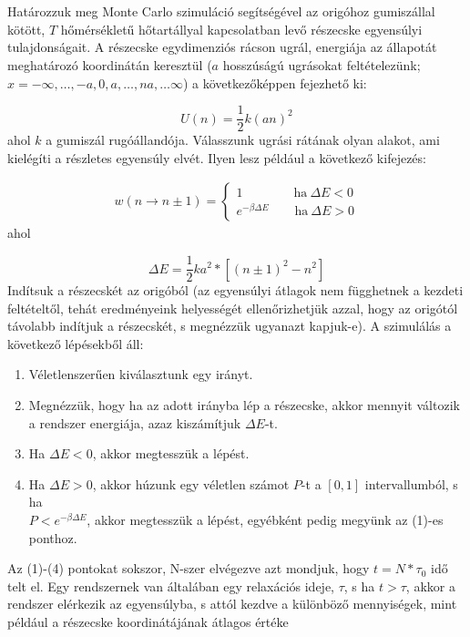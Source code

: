 \section{} \label{sec:1}
\quest{}
Határozzuk meg Monte Carlo szimuláció segítségével az origóhoz gumiszállal kötött, $T$ hőmérsékletű hőtartállyal kapcsolatban levő részecske egyensúlyi tulajdonságait. A részecske egydimenziós rácson ugrál, energiája az állapotát meghatározó koordinátán keresztül ($a$ hosszúságú ugrásokat feltételezünk; $x = - \infty, \dots, -a, 0, a, \dots, na, \dots \infty$) a következőképpen fejezhető ki:

\begin{equation*}
    U \left( n \right)
    =
    \frac{1}{2} k \left( a n \right)^{2}
\end{equation*}
ahol $k$ a gumiszál rugóállandója. Válasszunk ugrási rátának olyan alakot, ami kielégíti a részletes egyensúly elvét. Ilyen lesz például a következő kifejezés:

\begin{align*}
    w \left( n \to n \pm 1 \right)
    =
    \begin{cases}
        1 \quad \quad \quad \quad \text{ha}\ \Delta E < 0 \\
        e^{- \beta \Delta E} \quad \quad \text{ha}\ \Delta E > 0
    \end{cases}
\end{align*}
ahol

\begin{equation*}
    \Delta E
    =
    \frac{1}{2} k a^{2} * \left[ \left( n \pm 1 \right)^{2} - n^{2} \right]
\end{equation*}
Indítsuk a részecskét az origóból (az egyensúlyi átlagok nem függhetnek a kezdeti feltételtől, tehát eredményeink helyességét ellenőrizhetjük azzal, hogy az origótól távolabb indítjuk a részecskét, s megnézzük ugyanazt kapjuk-e). A szimulálás a következő lépésekből áll:

\begin{enumerate}
    \item Véletlenszerűen kiválasztunk egy irányt.
    \item Megnézzük, hogy ha az adott irányba lép a részecske, akkor mennyit változik a rendszer energiája, azaz kiszámítjuk $\Delta E$-t.
    \item Ha $\Delta E < 0$, akkor megtesszük a lépést.
    \item Ha $\Delta E > 0$, akkor húzunk egy véletlen számot $P$-t a $\left[ 0, 1 \right]$ intervallumból, s ha\\$P < e^{- \beta \Delta E}$, akkor megtesszük a lépést, egyébként pedig megyünk az (1)-es ponthoz.
\end{enumerate}
Az (1)-(4) pontokat sokszor, N-szer elvégezve azt mondjuk, hogy $t = N * \tau_{0}$ idő telt el. Egy rendszernek van általában egy relaxációs ideje, $\tau$, s ha $t > \tau$, akkor a rendszer elérkezik az egyensúlyba, s attól kezdve a különböző mennyiségek, mint például a részecske koordinátájának átlagos értéke

